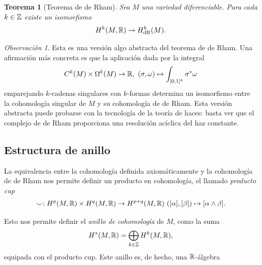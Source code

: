 \documentclass[11pt,a4paper]{amsbook}
\newtheorem{thm}[subsection]{Teorema}
\theoremstyle{remark} \newtheorem{rmk}[subsection]{Observación}
\theoremstyle{definition} \newtheorem{defn}[subsection]{Definición}
\theoremstyle{definition} \newtheorem{ex}[subsection]{Ejemplo}
\theoremstyle{definition} \newtheorem{ej}[subsection]{Ejercicio}
\begin{document}
\begin{thm}[Teorema de de Rham]
  Sea $M$ una variedad diferenciable. Para cada $k\in \mathbb Z$ existe un isomorfismo
  \begin{equation*}
H^k(M,\mathbb R) \rightarrow H^k_{\mathrm{dR}}(M).
  \end{equation*}
\end{thm}

\begin{rmk}
  Esta es una versión algo abstracta del teorema de de Rham. Una afirmación más concreta es que la aplicación dada por la integral
  \begin{equation*}
C^k(M) \times \Omega^k(M) \rightarrow \mathbb R,\ (\sigma,\omega) \mapsto \int_{[0,1]^k} \sigma^* \omega
  \end{equation*}
emparejando $k$-cadenas singulares con $k$-formas determina un isomorfismo entre la cohomología singular de $M$ y su cohomología de de Rham. Esta versión abstracta puede probarse con la tecnología de la teoría de haces: basta ver que el complejo de de Rham proporciona una resolución acíclica del haz constante.
\end{rmk}

\subsection{Estructura de anillo}
La equivalencia entre la cohomología definida axiomáticamente y la cohomología de de Rham nos permite definir un producto en cohomología, el llamado \emph{producto cup}
\begin{equation*}
\smile: H^p(M,\RR) \times H^q(M,\RR) \rightarrow H^{p+q}(M,\RR)\ ([\alpha],[\beta]) \mapsto [\alpha \wedge \beta].
\end{equation*}

Esto nos permite definir el \emph{anillo de cohomología} de $M$, como la suma
\begin{equation*}
H^*(M,\mathbb R)= \bigoplus_{k\in \mathbb Z} H^k(M,\mathbb R),
\end{equation*}
equipada con el producto cup. Este anillo es, de hecho, una $\mathbb R$-álgebra
\end{document}
